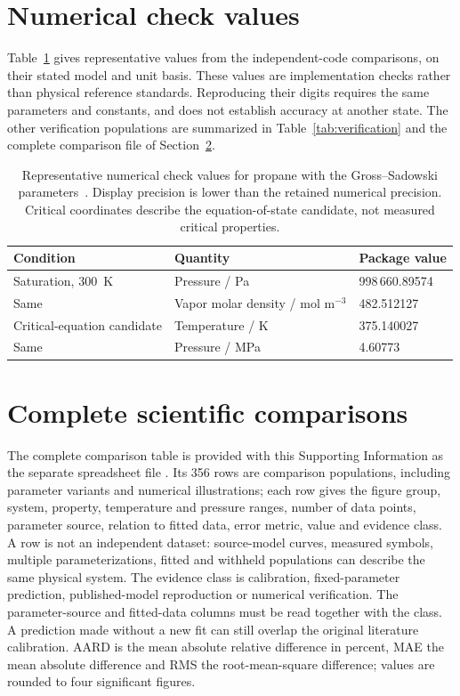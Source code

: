 \section{Numerical check values}
\label{sec:si-checks}
Table~\ref{tab:check-values} gives representative values from the independent-code comparisons, on their stated model and unit basis.
These values are implementation checks rather than physical reference standards.
Reproducing their digits requires the same parameters and constants, and does not establish accuracy at another state.
The other verification populations are summarized in Table~\ref{tab:verification} and the complete comparison file of Section~\ref{sec:si-comparisons}.

\begin{table}[pos=htbp]
\centering\small
\caption{Representative numerical check values for propane with the Gross--Sadowski parameters~\citep{Gross2001}. Display precision is lower than the retained numerical precision. Critical coordinates describe the equation-of-state candidate, not measured critical properties.}
\label{tab:check-values}
\begin{tabularx}{\linewidth}{@{}XXl@{}}
\toprule
Condition & Quantity & Package value \\
\midrule
Saturation, 300~K & Pressure / Pa & 998\,660.89574 \\
Same & Vapor molar density / mol m$^{-3}$ & 482.512127 \\
Critical-equation candidate & Temperature / K & 375.140027 \\
Same & Pressure / MPa & 4.60773 \\
\bottomrule
\end{tabularx}
\end{table}

\section{Complete scientific comparisons}
\label{sec:si-comparisons}
The complete comparison table is provided with this Supporting Information as the separate spreadsheet file .
Its 356 rows are comparison populations, including parameter variants and numerical illustrations; each row gives the figure group, system, property, temperature and pressure ranges, number of data points, parameter source, relation to fitted data, error metric, value and evidence class.
A row is not an independent dataset: source-model curves, measured symbols, multiple parameterizations, fitted and withheld populations can describe the same physical system.
The evidence class is calibration, fixed-parameter prediction, published-model reproduction or numerical verification.
The parameter-source and fitted-data columns must be read together with the class.
A prediction made without a new fit can still overlap the original literature calibration.
AARD is the mean absolute relative difference in percent, MAE the mean absolute difference and RMS the root-mean-square difference; values are rounded to four significant figures.

